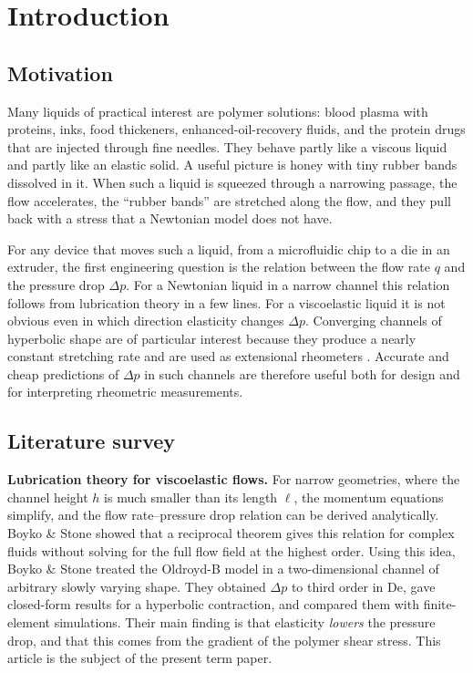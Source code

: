 \documentclass[11pt,a4paper]{article}
\newcommand{\De}{\mathrm{De}}
\begin{document}
\section{Introduction}

\subsection{Motivation}
Many liquids of practical interest are polymer solutions: blood plasma with proteins, inks, food thickeners, enhanced-oil-recovery fluids, and the protein drugs that are injected through fine needles. They behave partly like a viscous liquid and partly like an elastic solid. A useful picture is honey with tiny rubber bands dissolved in it. When such a liquid is squeezed through a narrowing passage, the flow accelerates, the ``rubber bands'' are stretched along the flow, and they pull back with a stress that a Newtonian model does not have.

For any device that moves such a liquid, from a microfluidic chip to a die in an extruder, the first engineering question is the relation between the flow rate $q$ and the pressure drop $\Delta p$. For a Newtonian liquid in a narrow channel this relation follows from lubrication theory in a few lines. For a viscoelastic liquid it is not obvious even in which direction elasticity changes $\Delta p$. Converging channels of hyperbolic shape are of particular interest because they produce a nearly constant stretching rate and are used as extensional rheometers \cite{oliveira2007}. Accurate and cheap predictions of $\Delta p$ in such channels are therefore useful both for design and for interpreting rheometric measurements.

\subsection{Literature survey}
\textbf{Lubrication theory for viscoelastic flows.} For narrow geometries, where the channel height $h$ is much smaller than its length $\ell$, the momentum equations simplify, and the flow rate--pressure drop relation can be derived analytically. Boyko \& Stone \cite{boyko2021} showed that a reciprocal theorem gives this relation for complex fluids without solving for the full flow field at the highest order. Using this idea, Boyko \& Stone \cite{boyko2022} treated the Oldroyd-B model \cite{oldroyd1950,bird1987} in a two-dimensional channel of arbitrary slowly varying shape. They obtained $\Delta p$ to third order in $\De$, gave closed-form results for a hyperbolic contraction, and compared them with finite-element simulations. Their main finding is that elasticity \emph{lowers} the pressure drop, and that this comes from the gradient of the polymer shear stress. This article is the subject of the present term paper.
\end{document}
